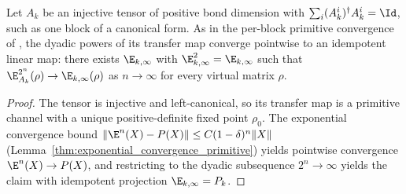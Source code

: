 \begin{lemma}%
    \label{thm:rg_flow_converges_of_cf}
    \leanok
    Let $A_k$ be an injective tensor of positive bond dimension with
    $\sum_i(A_k^i)^\dagger A_k^i=\Id$, such as one block of a canonical form.
    As in the per-block primitive
    convergence of \cite[Appendix~B, lines~1211--1244]{Cirac2016MPDO_arXiv},
    the dyadic powers of its transfer map converge pointwise to an idempotent
    linear map: there exists $\E_{k,\infty}$ with
    $\E_{k,\infty}^2=\E_{k,\infty}$ such that
    $\E_{A_k}^{2^n}(\rho)\to\E_{k,\infty}(\rho)$ as $n\to\infty$ for every
    virtual matrix $\rho$.
\end{lemma}
\begin{proof}\leanok
    The tensor is injective and left-canonical, so its transfer map is a
    primitive channel with a unique positive-definite fixed point $\rho_0$.
    The exponential convergence bound
    $\lVert \E^n(X)-P(X)\rVert\le C(1-\delta)^n\lVert X\rVert$
    (Lemma~\ref{thm:exponential_convergence_primitive}) yields pointwise
    convergence $\E^n(X)\to P(X)$, and restricting to the dyadic subsequence
    $2^n\to\infty$ yields the claim with idempotent projection $\E_{k,\infty}=P_k$.
\end{proof}

